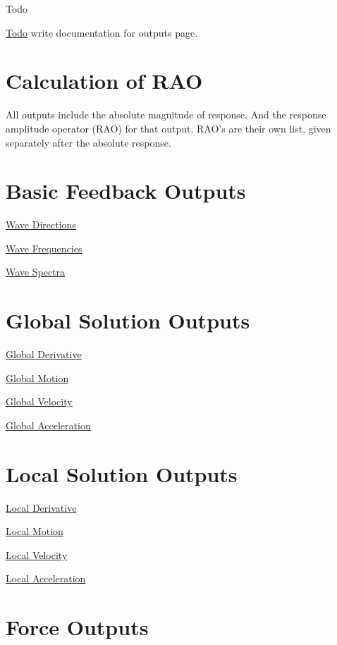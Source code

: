 \begin{DoxyRefDesc}{Todo}
\item[\hyperlink{todo__todo000034}{Todo}]write documentation for outputs page.\end{DoxyRefDesc}


\section*{Calculation of R\-A\-O}

All outputs include the absolute magnitude of response. And the response amplitude operator (R\-A\-O) for that output. R\-A\-O's are their own list, given separately after the absolute response.

\section*{Basic Feedback Outputs}

\hyperlink{wave_directions}{Wave Directions}

\hyperlink{wave_frequencies}{Wave Frequencies}

\hyperlink{output_wave_spectra}{Wave Spectra}

\section*{Global Solution Outputs}

\hyperlink{global_derivative}{Global Derivative}

\hyperlink{global_motion}{Global Motion}

\hyperlink{global_velocity}{Global Velocity}

\hyperlink{global_acceleration}{Global Acceleration}

\section*{Local Solution Outputs}

\hyperlink{local_derivative}{Local Derivative}

\hyperlink{local_motion}{Local Motion}

\hyperlink{local_velocity}{Local Velocity}

\hyperlink{local_acceleration}{Local Acceleration}

\section*{Force Outputs}

